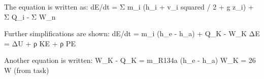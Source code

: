 The equation is written as:  
dE/dt = Σ m_i (h_i + v_i squared / 2 + g z_i) + Σ Q_i - Σ W_n  

Further simplifications are shown:  
dE/dt = m_i (h_e - h_a) + Q_K - W_K  
ΔE = ΔU + ρ KE + ρ PE  

Another equation is written:  
W_K - Q_K = m_R134a (h_e - h_a)  
W_K = 26 W (from task)